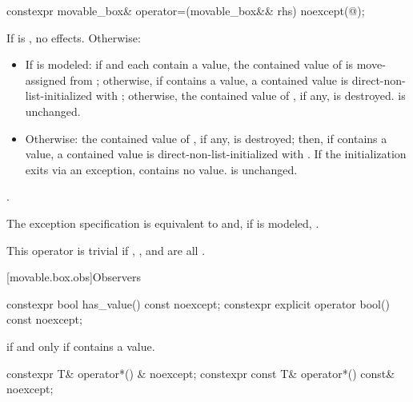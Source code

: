 %
\begin{itemdecl}
constexpr movable_box& operator=(movable_box&& rhs) noexcept(@\seebelow@);
\end{itemdecl}

\begin{itemdescr}
\pnum
\effects
If  is , no effects. Otherwise:
\begin{itemize}
\item If  is modeled: if  and  each contain a value, the contained value of  is move-assigned from ; otherwise, if  contains a value, a contained value is direct-non-list-initialized with ; otherwise, the contained value of , if any, is destroyed.  is unchanged.
\item Otherwise: the contained value of , if any, is destroyed; then, if  contains a value, a contained value is direct-non-list-initialized with . If the initialization exits via an exception,  contains no value.  is unchanged.
\end{itemize}

\pnum
\returns
{}.

\pnum
\remarks
The exception specification is equivalent to  and, if  is modeled, .

\pnum
This operator is trivial if , , and  are all .
\end{itemdescr}

[movable.box.obs]{Observers}

%
%
\begin{itemdecl}
constexpr bool has_value() const noexcept;
constexpr explicit operator bool() const noexcept;
\end{itemdecl}

\begin{itemdescr}
\pnum
\returns
{} if and only if  contains a value.
\end{itemdescr}

%
\begin{itemdecl}
constexpr T& operator*() & noexcept;
constexpr const T& operator*() const& noexcept;
\end{itemdecl}


